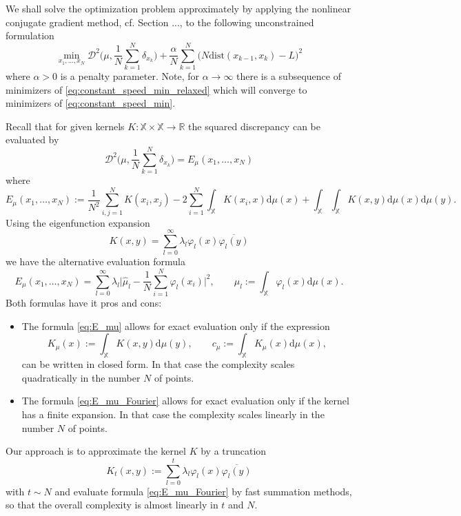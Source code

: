 \documentclass[%
a4paper,11pt,DIV=11,%
abstract=on%
]{scrartcl}
\begin{document}
We shall solve the optimization problem approximately by applying the nonlinear conjugate gradient method, cf. {\color{blue} Section ...}, to the following unconstrained formulation
\begin{equation}
  \label{eq:constant_speed_min_relaxed}
  \min_{x_{1},\dots,x_{N}} \mathscr{D}^{2} \Big(\mu, \frac{1}{N} \sum_{k=1}^{N} \delta_{x_{k}}\Big) +   \frac{\alpha}{N} \sum_{k=1}^{N} \big(N \mathrm{dist}(x_{k-1},x_{k}) - L \big)^{2}
\end{equation}
where $\alpha > 0$ is a penalty parameter. Note, for $\alpha \to \infty$ there is a subsequence of minimizers of \eqref{eq:constant_speed_min_relaxed} which will converge to minimizers of \eqref{eq:constant_speed_min}.

Recall that for given kernels $K:\mathbb X\times \mathbb X \to \mathbb R$ the squared discrepancy can be evaluated by
\[
  \mathscr D^{2}\Big(\mu, \frac 1N \sum_{k=1}^{N} \delta_{x_{k}}\Big) = E_{\mu}(x_{1},\dots,x_{N})
\]
where
\begin{equation}
  \label{eq:E_mu}
  E_{\mu}(x_{1},\dots,x_{N}) :=
    \frac{1}{N^{2}}\sum_{i,j=1}^{N} K(x_{i},x_{j}) - 2\sum_{i=1}^{N} \int_{\mathbb X} K(x_{i},x) \mathrm d\mu(x) + \int_{\mathbb X}\int_{\mathbb X} K(x,y) \mathrm d\mu(x) \mathrm d\mu(y).
  \end{equation}
Using the eigenfunction expansion
\[
 K(x,y) = \sum_{l=0}^{\infty} \lambda_{l} \varphi_{l}(x) \overline{\varphi_{l}(y)} 
\]
we have the alternative evaluation formula
\begin{equation}
  \label{eq:E_mu_Fourier}
  E_{\mu}(x_{1},\dots,x_{N}) = \sum_{l=0}^{\infty} \lambda_{l} \Big| \hat\mu_{l}
  - \frac 1N \sum_{i=1}^{N} \varphi_{l}(x_{i}) \Big|^{2}, \quad\quad \mu_{l} := \int_{\mathbb X} \varphi_{l}(x) \mathrm d\mu(x).
\end{equation}
Both formulas have it pros and cons:
\begin{itemize}
\item The formula \eqref{eq:E_mu} allows for exact evaluation only if the expression
\[
  K_{\mu}(x) := \int_{\mathbb X} K(x,y) \mathrm d\mu(y), \qquad  c_{\mu} := \int_{\mathbb X} K_{\mu}(x) \mathrm d\mu(x),
\]
can be written in closed form. In that case the complexity scales quadratically in the number $N$ of points.

\item The formula \eqref{eq:E_mu_Fourier} allows for exact evaluation only if the kernel has a finite expansion. In that case the complexity scales linearly in the number $N$ of points. 
\end{itemize}
Our approach is to approximate the kernel $K$ by a truncation
\[
  K_{t}(x,y) := \sum_{l=0}^{t} \lambda_{l} \varphi_{l}(x) \overline{\varphi_{l}(y)}
\]
with $t \sim N$ and evaluate formula \eqref{eq:E_mu_Fourier} by fast summation methods, so that the overall complexity is almost linearly in $t$ and $N$. 
\end{document}
